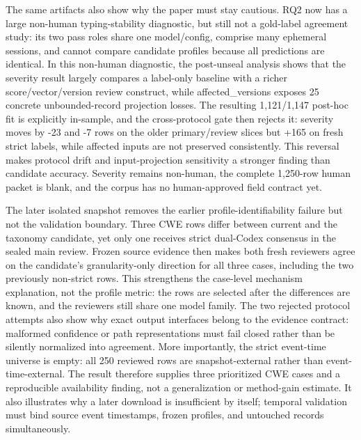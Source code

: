 The same artifacts also show why the paper must stay cautious. RQ2 now has a large non-human typing-stability diagnostic, but still not a gold-label agreement study: its two pass roles share one model/config, comprise many ephemeral sessions, and cannot compare candidate profiles because all predictions are identical. In this non-human diagnostic, the post-unseal analysis shows that the severity result largely compares a label-only baseline with a richer score/vector/version review construct, while affected\_versions exposes 25 concrete unbounded-record projection losses. The resulting 1,121/1,147 post-hoc fit is explicitly in-sample, and the cross-protocol gate then rejects it: severity moves by -23 and -7 rows on the older primary/review slices but +165 on fresh strict labels, while affected inputs are not preserved consistently. This reversal makes protocol drift and input-projection sensitivity a stronger finding than candidate accuracy. Severity remains non-human, the complete 1,250-row human packet is blank, and the corpus has no human-approved field contract yet.

The later isolated snapshot removes the earlier profile-identifiability failure but not the validation boundary. Three CWE rows differ between current and the taxonomy candidate, yet only one receives strict dual-Codex consensus in the sealed main review. Frozen source evidence then makes both fresh reviewers agree on the candidate's granularity-only direction for all three cases, including the two previously non-strict rows. This strengthens the case-level mechanism explanation, not the profile metric: the rows are selected after the differences are known, and the reviewers still share one model family. The two rejected protocol attempts also show why exact output interfaces belong to the evidence contract: malformed confidence or path representations must fail closed rather than be silently normalized into agreement. More importantly, the strict event-time universe is empty: all 250 reviewed rows are snapshot-external rather than event-time-external. The result therefore supplies three prioritized CWE cases and a reproducible availability finding, not a generalization or method-gain estimate. It also illustrates why a later download is insufficient by itself; temporal validation must bind source event timestamps, frozen profiles, and untouched records simultaneously.

